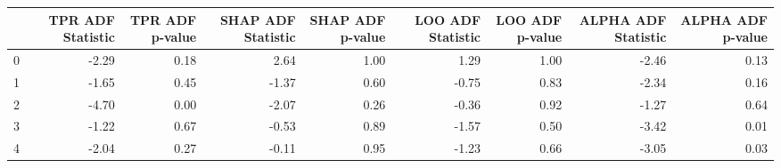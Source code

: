 \begin{tabular}{lrrrrrrrr}
\toprule
 & TPR ADF Statistic & TPR ADF p-value & SHAP ADF Statistic & SHAP ADF p-value & LOO ADF Statistic & LOO ADF p-value & ALPHA ADF Statistic & ALPHA ADF p-value \\
\midrule
0 & -2.29 & 0.18 & 2.64 & 1.00 & 1.29 & 1.00 & -2.46 & 0.13 \\
1 & -1.65 & 0.45 & -1.37 & 0.60 & -0.75 & 0.83 & -2.34 & 0.16 \\
2 & -4.70 & 0.00 & -2.07 & 0.26 & -0.36 & 0.92 & -1.27 & 0.64 \\
3 & -1.22 & 0.67 & -0.53 & 0.89 & -1.57 & 0.50 & -3.42 & 0.01 \\
4 & -2.04 & 0.27 & -0.11 & 0.95 & -1.23 & 0.66 & -3.05 & 0.03 \\
\bottomrule
\end{tabular}
